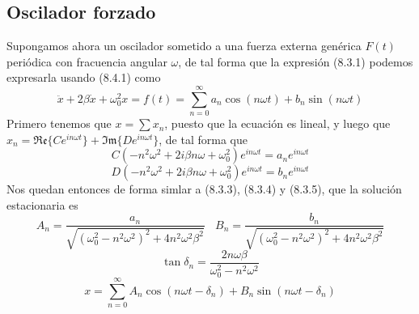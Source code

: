 \subsection{Oscilador forzado}
Supongamos ahora un oscilador sometido a una fuerza externa genérica $F(t)$ periódica con fracuencia angular $\omega$, de tal forma que la expresión (8.3.1) podemos expresarla usando (8.4.1) como
\begin{equation} \label{6.1.1}
    \ddot{x} +2\beta \dot{x} +\omega_0^2 x = f(t) = \sum_{n=0}^\infty a_n \cos (n\omega t) + b_n \sin (n\omega t)
\end{equation}
Primero tenemos que $x = \sum x_n$, puesto que la ecuación es lineal, y luego que $x_n = \mathfrak{Re}\{Ce^{in\omega t}\}+\mathfrak{Im}\{De^{in\omega t}\}$, de tal forma que 
\begin{equation} \label{6.1.1}
    C(-n^2\omega^2 +2 i\beta n\omega +\omega_0^2)e^{in\omega t} = a_n e^{in\omega t}
\end{equation}
\vspace{-20pt}
\begin{equation} \label{6.1.1}
    D(-n^2\omega^2 +2 i\beta n\omega +\omega_0^2)e^{in\omega t} = b_n e^{in\omega t}
\end{equation}
Nos quedan entonces de forma simlar a (8.3.3), (8.3.4) y (8.3.5), que la solución estacionaria es 
\begin{equation} \label{6.1.1}
    A_n = \frac{a_n}{\sqrt{\left(\omega_0^2 -n^2\omega^2\right)^2+4n^2\omega^2 \beta^2}} \ \ \ \ B_n = \frac{b_n}{\sqrt{\left(\omega_0^2 -n^2\omega^2\right)^2+4n^2\omega^2 \beta^2}}
\end{equation}
\begin{equation} \label{6.1.1}
    \tan \delta_n = \frac{2n\omega \beta}{\omega_0^2 - n^2\omega^2}
\end{equation}
\begin{equation} \label{6.1.1}
    x =  \sum_{n=0}^\infty A_n \cos(n\omega t - \delta_n) + B_n\sin(n\omega t - \delta_n)
\end{equation}